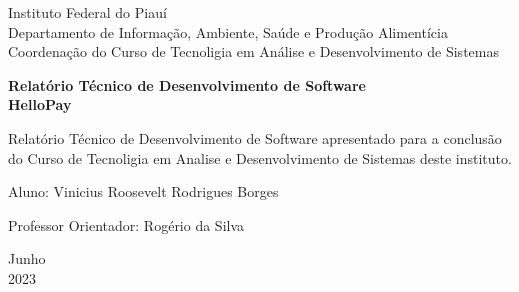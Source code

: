 \documentclass[a4paper,12pt]{article}
\begin{document}
\begin{titlepage}
    \begin{center}


        \Huge{Instituto Federal do Piauí}\\
        \large{Departamento de Informação, Ambiente, Saúde e Produção Alimentícia}\\
        \large{Coordenação do Curso de Tecnoligia em Análise e Desenvolvimento de Sistemas}\\
        \vspace{15pt}
        \vspace{45pt}
        \vspace{15pt}

        \vspace{85pt}

        \textbf{\large{Relatório Técnico de Desenvolvimento de Software}}\\
        \vspace{1,5cm}
        \textbf{\LARGE{HelloPay}}

    \end{center}
    \vspace{1,5cm}

    \begin{flushright}

        \begin{list}{}{
                \setlength{\leftmargin}{4.5cm}
                \setlength{\rightmargin}{0cm}
                \setlength{\labelwidth}{0pt}
                \setlength{\labelsep}{\leftmargin}}

            \item Relatório Técnico de Desenvolvimento de Software apresentado para a conclusão do Curso de Tecnoligia em Analise e Desenvolvimento de Sistemas deste instituto.

                  \begin{list}{}{
                          \setlength{\leftmargin}{0cm}
                          \setlength{\rightmargin}{0cm}
                          \setlength{\labelwidth}{0pt}
                          \setlength{\labelsep}{\leftmargin}}

                      \item Aluno: Vinicius Roosevelt Rodrigues Borges
                      \item Professor Orientador: Rogério da Silva\

                  \end{list}
        \end{list}
    \end{flushright}
    \vspace{1cm}
    \begin{center}
        \vspace{\fill}
        Junho\\
        2023
    \end{center}
\end{titlepage}
\end{document}
